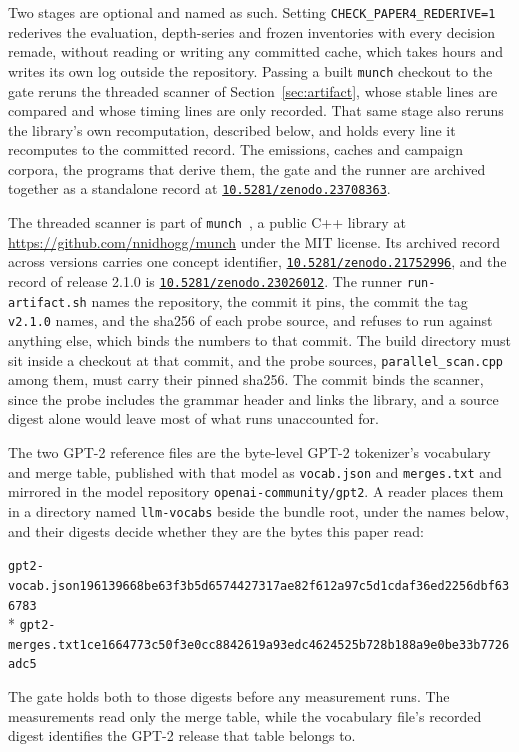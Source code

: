 \documentclass[11pt,a4paper]{article}
\theoremstyle{definition}
\theoremstyle{plain}
\newcommand{\code}[1]{\texttt{#1}}
\newcommand{\zenodo}[1]{{\urlstyle{rm}\href{https://doi.org/#1}{\nolinkurl{#1}}}}
\begin{document}
Two stages are optional and named as such. Setting \code{CHECK\_PAPER4\_REDERIVE=1} rederives the evaluation,
depth-series and frozen inventories with every decision remade, without reading or writing any committed cache, which
takes hours and writes its own log outside the repository. Passing a built \code{munch} checkout to the gate reruns the
threaded scanner of Section~\ref{sec:artifact}, whose stable lines are compared and whose timing lines are only
recorded. That same stage also reruns the library's own recomputation, described below, and holds every line it
recomputes to the committed record. The emissions, caches and campaign corpora, the programs that derive them, the gate
and the runner are archived together as a standalone record at \zenodo{10.5281/zenodo.23708363}.

The threaded scanner is part of \code{munch}~\citep{munch}, a public C++ library at
\url{https://github.com/nnidhogg/munch} under the MIT license. Its archived record across versions carries one concept
identifier, \zenodo{10.5281/zenodo.21752996}, and the record of release 2.1.0 is \zenodo{10.5281/zenodo.23026012}. The
runner \code{run-artifact.sh} names the repository, the commit it pins, the commit the tag \texttt{v2.1.0} names, and
the sha256 of each probe source, and refuses to run against anything else, which binds the numbers to that commit. The
build directory must sit inside a checkout at that commit, and the probe sources, \code{parallel\_scan.cpp} among them,
must carry their pinned sha256. The commit binds the scanner, since the probe includes the grammar header and links the
library, and a source digest alone would leave most of what runs unaccounted for.

The two GPT-2 reference files are the byte-level GPT-2 tokenizer's vocabulary and merge table, published with that model
as \code{vocab.json} and \code{merges.txt} and mirrored in the model repository \code{openai-community/gpt2}. A reader
places them in a directory named \code{llm-vocabs} beside the bundle root, under the names below, and their digests
decide whether they are the bytes this paper read:

\begin{center}\small
\code{gpt2-vocab.json}\quad\code{196139668be63f3b5d6574427317ae82f612a97c5d1cdaf36ed2256dbf636783}\\*
\code{gpt2-merges.txt}\quad\code{1ce1664773c50f3e0cc8842619a93edc4624525b728b188a9e0be33b7726adc5}
\end{center}

\noindent The gate holds both to those digests before any measurement runs. The measurements read only the merge table,
while the vocabulary file's recorded digest identifies the GPT-2 release that table belongs to.
\end{document}
